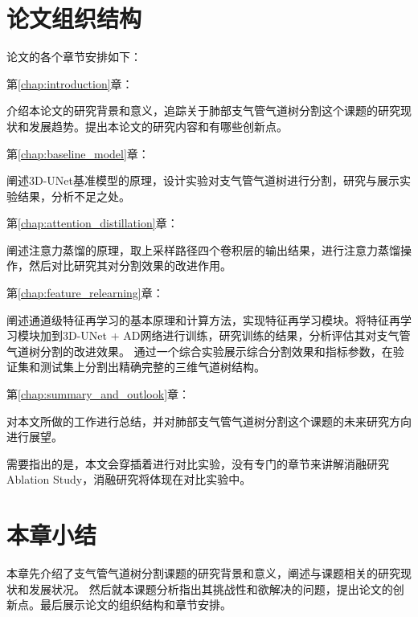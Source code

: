 \section{论文组织结构}

论文的各个章节安排如下：

{\kaishu 第\ref{chap:introduction}章：}

介绍本论文的研究背景和意义，追踪关于肺部支气管气道树分割这个课题的研究现状和发展趋势。提出本论文的研究内容和有哪些创新点。

{\kaishu 第\ref{chap:baseline_model}章：}

阐述3D-UNet基准模型的原理，设计实验对支气管气道树进行分割，研究与展示实验结果，分析不足之处。

{\kaishu 第\ref{chap:attention_distillation}章：}

阐述注意力蒸馏的原理，取上采样路径四个卷积层的输出结果，进行注意力蒸馏操作，然后对比研究其对分割效果的改进作用。

{\kaishu 第\ref{chap:feature_relearning}章：}

阐述通道级特征再学习的基本原理和计算方法，实现特征再学习模块。将特征再学习模块加到3D-UNet + AD网络进行训练，研究训练的结果，分析评估其对支气管气道树分割的改进效果。
通过一个综合实验展示综合分割效果和指标参数，在验证集和测试集上分割出精确完整的三维气道树结构。

{\kaishu 第\ref{chap:summary_and_outlook}章：}

对本文所做的工作进行总结，并对肺部支气管气道树分割这个课题的未来研究方向进行展望。

需要指出的是，本文会穿插着进行对比实验，没有专门的章节来讲解消融研究Ablation Study，消融研究将体现在对比实验中。

\section{本章小结}

本章先介绍了支气管气道树分割课题的研究背景和意义，阐述与课题相关的研究现状和发展状况。 然后就本课题分析指出其挑战性和欲解决的问题，提出论文的创新点。最后展示论文的组织结构和章节安排。



